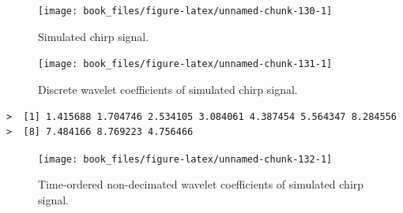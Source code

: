 \documentclass[b5paper,]{scrbook}
\makeatletter
\newenvironment{Shaded}{\begin{snugshade}}{\end{snugshade}}
\newcommand{\KeywordTok}[1]{\textcolor[rgb]{0.13,0.29,0.53}{\textbf{{#1}}}}
\newcommand{\DataTypeTok}[1]{\textcolor[rgb]{0.13,0.29,0.53}{{#1}}}
\newcommand{\DecValTok}[1]{\textcolor[rgb]{0.00,0.00,0.81}{{#1}}}
\newcommand{\StringTok}[1]{\textcolor[rgb]{0.31,0.60,0.02}{{#1}}}
\newcommand{\NormalTok}[1]{{#1}}
\theoremstyle{plain}
\theoremstyle{definition}
\numberwithin{equation}{section}
\newenvironment{kframe}{%
\medskip{}
\setlength{\fboxsep}{.8em}
 \def\at@end@of@kframe{}%
 \ifinner\ifhmode%
  \def\at@end@of@kframe{\end{minipage}}%
  \begin{minipage}{\columnwidth}%
 \fi\fi%
 \def\FrameCommand##1{\hskip\@totalleftmargin \hskip-\fboxsep
 \colorbox{shadecolor}{##1}\hskip-\fboxsep
     \hskip-\linewidth \hskip-\@totalleftmargin \hskip\columnwidth}%
 \MakeFramed {\advance\hsize-\width
   \@totalleftmargin\z@ \linewidth\hsize
   \@setminipage}}%
 {\par\unskip\endMakeFramed%
 \at@end@of@kframe}
\renewenvironment{Shaded}{\begin{kframe}}{\end{kframe}}
\makeatother
\begin{document}
\begin{figure}

{\centering \texttt{[image: book\_files/figure-latex/unnamed-chunk-130-1]} 

}

\caption{Simulated chirp signal.}\label{fig:unnamed-chunk-130}
\end{figure}

\begin{Shaded}
\end{Shaded}

\begin{figure}

{\centering \texttt{[image: book\_files/figure-latex/unnamed-chunk-131-1]} 

}

\caption{Discrete wavelet coefficients of simulated chirp signal.}\label{fig:unnamed-chunk-131}
\end{figure}

\begin{verbatim}
>  [1] 1.415688 1.704746 2.534105 3.084061 4.387454 5.564347 8.284556
>  [8] 7.484166 8.769223 4.756466
\end{verbatim}

\begin{Shaded}
\end{Shaded}

\begin{figure}

{\centering \texttt{[image: book\_files/figure-latex/unnamed-chunk-132-1]} 

}

\caption{Time-ordered non-decimated wavelet coefficients of simulated chirp signal.}\label{fig:unnamed-chunk-132}
\end{figure}
\end{document}

